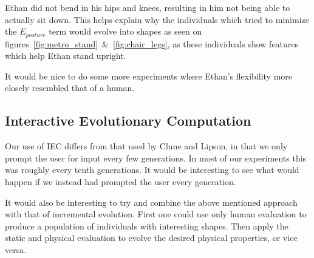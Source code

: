 Ethan did not bend in his hips and knees, resulting in him not being able to 
actually sit down. This helps explain why the individuals which tried to 
minimize the $E_{posture}$ term would evolve into shapes as seen on
figures~\ref{fig:metro_stand}~\&~\ref{fig:chair_legs}, as these individuals 
show features which help Ethan stand upright.

It would be nice to do some more experiments where Ethan's flexibility more
closely resembled that of a human.

\subsection{Interactive Evolutionary Computation}
Our use of IEC differs from that used by Clune and
Lipson\cite{Clune:2011:EOG:2078245.2078246}, in that we only prompt the user
for input every few generations. In most of our experiments this was roughly
every tenth generations. It would be interesting to see what would happen if we
instead had prompted the user every generation. 

It would also be interesting to try and combine the above mentioned approach
with that of incremental evolution. First one could use only human evaluation
to produce a population of individuals with interesting shapes. Then apply the
static and physical evaluation to evolve the desired physical properties, or 
vice
versa.
